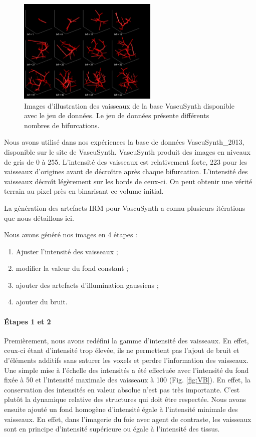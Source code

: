 \begin{figure}[!ht]
  \centering
  \includegraphics[height=5cm]{Images/snapVascu.png}
  
  \caption{Images d'illustration des vaisseaux de la base VascuSynth disponible avec le jeu de données. Le jeu de données présente différents nombres de bifurcations.}
  \label{fig:snap_vascu}
\end{figure}

Nous avons utilisé dans nos expériences la base de données VascuSynth\_2013, disponible sur le site de VascuSynth. VascuSynth produit des images en niveaux de gris de 0 à 255. L'intensité des vaisseaux est relativement forte, 223 pour les vaisseaux d'origines avant de décroître après chaque bifurcation. L'intensité des vaisseaux décroît légèrement sur les bords de ceux-ci. On peut obtenir une vérité terrain au pixel près en binarisant ce volume initial.

La génération des artefacts IRM pour VascuSynth a connu plusieurs itérations que nous détaillons ici.

Nous avons généré nos images en 4 étapes :
\begin{enumerate}
\item Ajuster l'intensité des vaisseaux ;
\item modifier la valeur du fond constant ; 
\item ajouter des artefacts d'illumination gaussiens ;
\item ajouter du bruit.
\end{enumerate}

\paragraph{Étapes 1 et 2}
Premièrement, nous avons redéfini la gamme d'intensité des vaisseaux. En effet, ceux-ci étant d'intensité trop élevée, ils ne permettent pas l'ajout de bruit et d'éléments additifs sans saturer les voxels et perdre l'information des vaisseaux. Une simple mise à l'échelle des intensités a été effectuée avec l'intensité du fond fixée à 50 et l'intensité maximale des vaisseaux à 100 (Fig. \ref{fig:VB}). En effet, la conservation des intensités en valeur absolue n'est pas très importante. C'est plutôt la dynamique relative des structures qui doit être respectée. Nous avons ensuite ajouté un fond homogène d'intensité égale à l'intensité minimale des vaisseaux. En effet, dans l'imagerie du foie avec agent de contraste, les vaisseaux sont en principe d'intensité supérieure ou égale à l'intensité des tissus.

